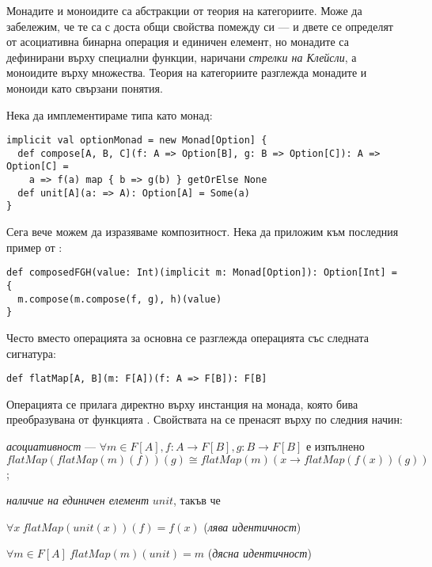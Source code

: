 Монадите и моноидите са абстракции от теория на категориите. Може да забележим, че те са с доста общи свойства помежду си — и двете се определят от асоциативна бинарна операция и единичен елемент, но монадите са дефинирани върху специални функции, наричани \emph{стрелки на Клейсли}, а моноидите върху множества. Теория на категориите разглежда монадите и моноиди като свързани понятия.

Нека да имплементираме типа  като монад:

\begin{lstlisting}
implicit val optionMonad = new Monad[Option] {
  def compose[A, B, C](f: A => Option[B], g: B => Option[C]): A => Option[C] =
    a => f(a) map { b => g(b) } getOrElse None
  def unit[A](a: => A): Option[A] = Some(a)
}
\end{lstlisting}

Сега вече можем да изразяваме композитност. Нека да приложим  към последния пример от :

\begin{lstlisting}
def composedFGH(value: Int)(implicit m: Monad[Option]): Option[Int] = {
  m.compose(m.compose(f, g), h)(value)
}
\end{lstlisting}

Често вместо операцията  за основна се разглежда операцията  със следната сигнатура:

\begin{lstlisting}
def flatMap[A, B](m: F[A])(f: A => F[B]): F[B]
\end{lstlisting}

Операцията се прилага директно върху инстанция на монада, която бива преобразувана от функцията . Свойствата на  се пренасят върху  по следния начин:

\begin{itemize*}
  \item \emph{асоциативност} — $\forall m \in F[A], f: A \rightarrow F[B], g: B \rightarrow F[B]$ е изпълнено $flatMap(flatMap(m)(f))(g) \cong flatMap(m)(x \rightarrow flatMap(f(x))(g))$;
  \item \emph{наличие на единичен елемент} $unit$, такъв че
  \begin{itemize*}
    \item $\forall x~flatMap(unit(x))(f) = f(x)$ (\emph{лява идентичност})
    \item $\forall m \in F[A]~flatMap(m)(unit) = m$ (\emph{дясна идентичност})
  \end{itemize*}
\end{itemize*}

